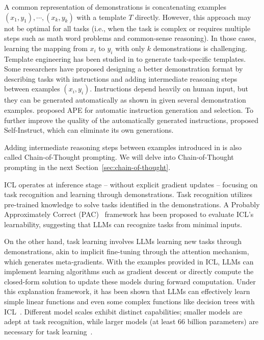 A common representation of demonstrations is concatenating examples $(x_1, y_1), \cdots, (x_k, y_k)$ with a template $T$ directly.
However, this approach may not be optimal for all tasks (i.e., when the task is complex or requires multiple steps such as math word problems and common-sense reasoning).
In those cases, learning the mapping from $x_i$ to $y_i$ with only $k$ demonstrations is challenging.
Template engineering has been studied in \textcite{liu2021pretrain, liu2022good} to generate task-specific templates.
Some researchers have proposed designing a better demonstration format by describing tasks with instructions and adding intermediate reasoning steps between examples $(x_i, y_i)$.
Instructions depend heavily on human input, but they can be generated automatically as shown in \textcite{honovich2022instruction} given several demonstration examples.
\textcite{zhou2023large} proposed APE for automatic instruction generation and selection.
To further improve the quality of the automatically generated instructions, \textcite{wang2022selfinstruct} proposed Self-Instruct, which can eliminate its own generations.

Adding intermediate reasoning steps between examples introduced in \textcite{wang2023large} is also called Chain-of-Thought prompting.
We will delve into Chain-of-Thought prompting in the next Section~\ref{sec:chain-of-thought}.

ICL operates at inference stage -- without explicit gradient updates -- focusing on task recognition and learning through demonstrations.
Task recognition utilizes pre-trained knowledge to solve tasks identified in the demonstrations.
A Probably Approximately Correct (PAC)~\cite{wies2023learnability} framework has been proposed to evaluate ICL’s learnability, suggesting that LLMs can recognize tasks from minimal inputs.

On the other hand, task learning involves LLMs learning new tasks through demonstrations, akin to implicit fine-tuning through the attention mechanism, which generates meta-gradients.
With the examples provided in ICL, LLMs can implement learning algorithms such as gradient descent or directly compute the closed-form solution to update these models during forward computation.
Under this explanation framework, it has been shown that LLMs can effectively learn simple linear functions and even some complex functions like decision trees with ICL~\cite{akyurek2022what}.
Different model scales exhibit distinct capabilities; smaller models are adept at task recognition, while larger models (at least 66 billion parameters) are necessary for task learning~\cite{pan2023what}.

